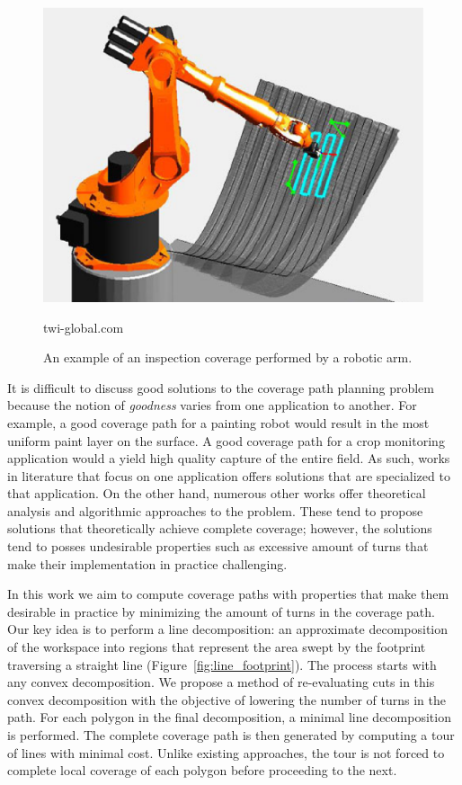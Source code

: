 \documentclass[../main.tex]{subfiles}
\begin{document}
\begin{figure}
	\centering
	\includegraphics[scale=0.5]{img/chapter_1/example_coverage.eps}
	\vskip-15pt
	\caption*{\tiny twi-global.com}
	\caption{An example of an inspection coverage performed by a robotic arm.}
	\label{img:example_coverage}
\end{figure}

It is difficult to discuss good solutions to the coverage path planning problem because the notion of \emph{goodness} varies from one application to another. For example, a good coverage path for a painting robot would result in the most uniform paint layer on the surface. A good coverage path for a crop monitoring application would a yield high quality capture of the entire field. As such, works in literature that focus on one application offers solutions that are specialized to that application. On the other hand, numerous other works offer theoretical analysis and algorithmic approaches to the problem. These tend to propose solutions that theoretically achieve complete coverage; however, the solutions tend to posses undesirable properties such as excessive amount of turns that make their implementation in practice challenging.

In this work we aim to compute coverage paths with properties that make them desirable in practice by minimizing the amount of turns in the coverage path. Our key idea is to perform a line decomposition: an approximate decomposition of the workspace into regions that represent the area swept by the footprint traversing a straight line (Figure~\ref{fig:line_footprint}). The process starts with any convex decomposition. We propose a method of re-evaluating cuts in this convex decomposition with the objective of lowering the number of turns in the path. For each polygon in the final decomposition, a minimal line decomposition is performed. The complete coverage path is then generated by computing a tour of lines with minimal cost. Unlike existing approaches, the tour is not forced to complete local coverage of each polygon before proceeding to the next.
\end{document}
